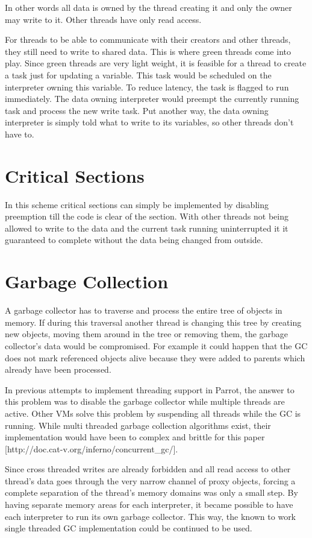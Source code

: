 \documentclass[bachelor,english]{hgbthesis}
\begin{document}
In other words all data is owned by the thread creating it and only the owner may write to it. Other threads have only read access.

For threads to be able to communicate with their creators and other threads, they still need to write to shared data. This is where green threads come into play. Since green threads are very light weight, it is feasible for a thread to create a task just for updating a variable. This task would be scheduled on the interpreter owning this variable. To reduce latency, the task is flagged to run immediately. The data owning interpreter would preempt the currently running task and process the new write task. Put another way, the data owning interpreter is simply told what to write to its variables, so other threads don't have to.

\section{Critical Sections}

In this scheme critical sections can simply be implemented by disabling preemption till the code is clear of the section. With other threads not being allowed to write to the data and the current task running uninterrupted it it guaranteed to complete without the data being changed from outside.

\section{Garbage Collection}

A garbage collector has to traverse and process the entire tree of objects in memory. If during this traversal another thread is changing this tree by creating new objects, moving them around in the tree or removing them, the garbage collector's data would be compromised. For example it could happen that the GC does not mark referenced objects alive because they were added to parents which already have been processed.

In previous attempts to implement threading support in Parrot, the answer to this problem was to disable the garbage collector while multiple threads are active. Other VMs solve this problem by suspending all threads while the GC is running. While multi threaded garbage collection algorithms exist, their implementation would have been to complex and brittle for this paper [http://doc.cat-v.org/inferno/concurrent\_gc/].

Since cross threaded writes are already forbidden and all read access to other thread's data goes through the very narrow channel of proxy objects, forcing a complete separation of the thread's memory domains was only a small step. By having separate memory areas for each interpreter, it became possible to have each interpreter to run its own garbage collector. This way, the known to work single threaded GC implementation could be continued to be used.
\end{document}
